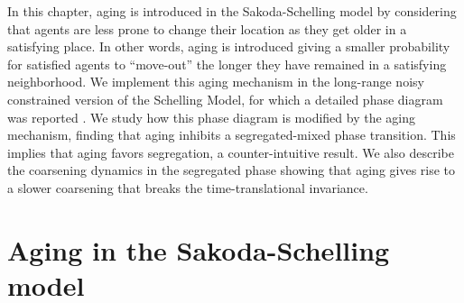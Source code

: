 In this chapter, aging is introduced in the Sakoda-Schelling model by considering that agents are less prone to change their location as they get older in a satisfying place. In other words, aging is introduced giving a smaller probability for  satisfied agents to ``move-out'' the longer they have remained in a satisfying neighborhood. We implement this aging mechanism in the long-range noisy constrained version of the Schelling Model, for which a detailed phase diagram was reported \cite{Gauvin_2009}. We study how this phase diagram is modified by the aging mechanism, finding that aging inhibits a segregated-mixed phase transition. This implies that aging favors segregation, a counter-intuitive result. We also describe the coarsening dynamics in the segregated phase showing that aging gives rise to a slower coarsening that breaks the time-translational invariance.




\section{Aging in the Sakoda-Schelling model}

